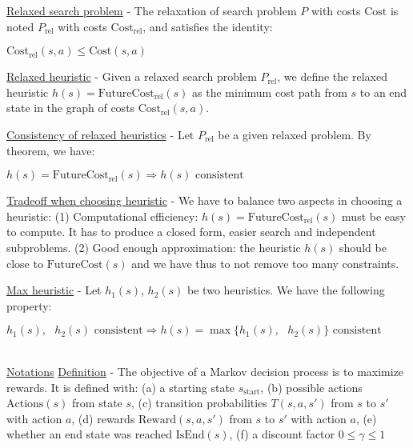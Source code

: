 \documentclass[4pt,landscape]{article}
\begin{document}
\begin{multicols*}{4}
{\underline{Relaxed search problem} - The relaxation of search problem $P$ with costs $\textrm{Cost}$ is noted $P_{\textrm{rel}}$ with costs $\textrm{Cost}_{\textrm{rel}}$, and satisfies the identity:}\par

${\textrm{Cost}_{\textrm{rel}}(s,a)\leqslant\textrm{Cost}(s,a)}$


{\underline{Relaxed heuristic} - Given a relaxed search problem $P_{\textrm{rel}}$, we define the relaxed heuristic $h(s)=\textrm{FutureCost}_{\textrm{rel}}(s)$ as the minimum cost path from $s$ to an end state in the graph of costs $\textrm{Cost}_{\textrm{rel}}(s,a)$.}\par

{\underline{Consistency of relaxed heuristics} - Let $P_{\textrm{rel}}$ be a given relaxed problem. By theorem, we have:}\par

${h(s)=\textrm{FutureCost}_{\textrm{rel}}(s)\Longrightarrow h(s)\textrm{ consistent}}$


{\underline{Tradeoff when choosing heuristic} - We have to balance two aspects in choosing a heuristic:
(1) Computational efficiency: $h(s)=\textrm{FutureCost}_{\textrm{rel}}(s)$ must be easy to compute. It has to produce a closed form, easier search and independent subproblems.
(2) Good enough approximation: the heuristic $h(s)$ should be close to $\textrm{FutureCost}(s)$ and we have thus to not remove too many constraints.}\par

{\underline{Max heuristic} - Let \tiny $h_1(s)$, $h_2(s)$ be two heuristics. We have the following property:}\par

${h_1(s),\textrm{ }h_2(s)\textrm{ consistent}\Longrightarrow h(s)=\max\{h_1(s),\textrm{ }h_2(s)\}\textrm{ consistent}}$


{\color{cyan} \hrulefill}\\
\underline{Notations}
{\underline{Definition} - The objective of a Markov decision process is to maximize rewards. It is defined with: (a) a starting state $s_{\textrm{start}}$, (b) possible actions $\textrm{Actions}(s)$ from state $s$, (c) transition probabilities $T(s,a,s')$ from $s$ to $s'$ with action $a$, (d) rewards $\textrm{Reward}(s,a,s')$ from $s$ to $s'$ with action $a$, (e) whether an end state was reached $\textrm{IsEnd}(s)$, (f) a discount factor $0\leqslant\gamma\leqslant1$
}\par



\end{multicols*}
\end{document}
